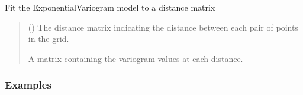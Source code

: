 \documentclass[letterpaper,10pt,english]{sphinxmanual}
\begin{document}
\begin{fulllineitems}
\begin{quote}
\begin{description}
\begin{itemize}
\end{itemize}

\end{description}\end{quote}

\begin{fulllineitems}
\label{\detokenize{covariance:glomar_gridding.variogram.ExponentialVariogram.fit}}
\pysigstartsignatures
\pysiglinewithargsret
{}
{}
{}
\pysigstopsignatures
\sphinxAtStartPar
Fit the ExponentialVariogram model to a distance matrix
\begin{quote}\begin{description}
\sphinxAtStartPar
{} () \textendash{} The distance matrix indicating the distance between each pair of
points in the grid.

\sphinxAtStartPar
A matrix containing the variogram values at each distance.

\sphinxAtStartPar
{}

\end{description}\end{quote}
\subsubsection*{Examples}

\begin{sphinxVerbatim}[commandchars=\\\{\}]
  
\end{sphinxVerbatim}

\end{fulllineitems}


\end{fulllineitems}
\end{document}
